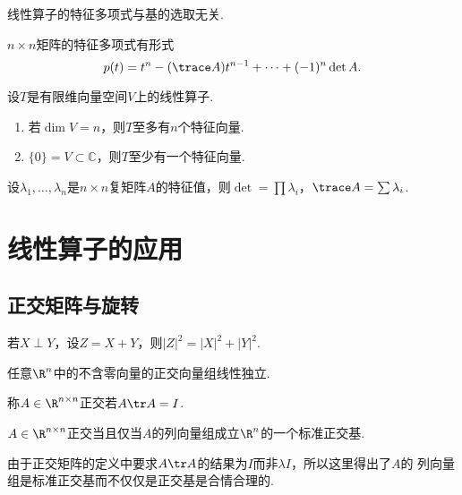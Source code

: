  \begin{thm}
    线性算子的特征多项式与基的选取无关.
  \end{thm}

  \begin{thm}
    $n\times n$矩阵的特征多项式有形式
    \[
      p(t) = t^n - (\trace A)t^{n-1} + \cdots + (-1)^n\det A.
    \]
  \end{thm}

  \begin{thm}
    设$T$是有限维向量空间$V$上的线性算子.
    \begin{enumerate}
      \item 若$\dim V=n$，则$T$至多有$n$个特征向量.
      \item $\{0\}=V\subset\mathbb{C}$，则$T$至少有一个特征向量.
    \end{enumerate}
  \end{thm}

  \begin{thm}
    设$\lambda_1,\dots,\lambda_n$是$n\times n$复矩阵$A$的特征值，则$\det=
    \prod\lambda_i$，$\trace A=\sum\lambda_i$.
  \end{thm}


\newpage
\section{线性算子的应用}

\subsection{正交矩阵与旋转}
  \begin{thm}
    若$X\perp Y$，设$Z=X+Y$，则$|Z|^2=|X|^2+|Y|^2$.
  \end{thm}

  \begin{cor}
    任意$\R^n$中的不含零向量的正交向量组线性独立.
  \end{cor}

  \begin{defi}[正交矩阵]
    称$A\in\R^{n\times n}$正交若$A\tr A=I$.
  \end{defi}

  \begin{lemma}
    $A\in\R^{n\times n}$正交当且仅当$A$的列向量组成立$\R^{n}$的一个标准正交基.
  \end{lemma}
  \remark
    由于正交矩阵的定义中要求$A\tr A$的结果为$I$而非$\lambda I$，所以这里得出了$A$的
    列向量组是标准正交基而不仅仅是正交基是合情合理的.

